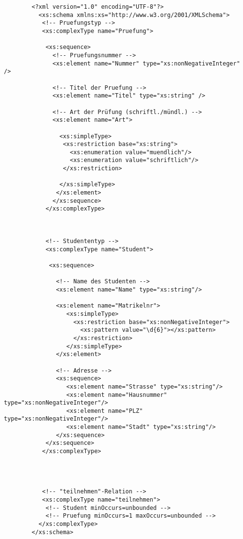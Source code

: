
	\begin{verbatim}
		<?xml version="1.0" encoding="UTF-8"?>
		  <xs:schema xmlns:xs="http://www.w3.org/2001/XMLSchema">
		   <!-- Pruefungstyp -->
		   <xs:complexType name="Pruefung">
		
		    <xs:sequence>
		      <!-- Pruefungsnummer -->
		      <xs:element name="Nummer" type="xs:nonNegativeInteger" />
		
		      <!-- Titel der Pruefung -->
		      <xs:element name="Titel" type="xs:string" />
		
		      <!-- Art der Prüfung (schriftl./mündl.) -->
		      <xs:element name="Art">
		 
		        <xs:simpleType>
		         <xs:restriction base="xs:string">
		           <xs:enumeration value="muendlich"/>
		           <xs:enumeration value="schriftlich"/>
		         </xs:restriction>
		
		        </xs:simpleType>
		       </xs:element>
		      </xs:sequence>
		    </xs:complexType>
		
		
		
		    <!-- Studententyp -->
		    <xs:complexType name="Student">
		    
		     <xs:sequence>
		     
		       <!-- Name des Studenten -->
		       <xs:element name="Name" type="xs:string"/>
		
		       <xs:element name="Matrikelnr">
		          <xs:simpleType>
		            <xs:restriction base="xs:nonNegativeInteger">
		              <xs:pattern value="\d{6}"></xs:pattern>
		            </xs:restriction>
		          </xs:simpleType>
		       </xs:element>
		       
		       <!-- Adresse -->
		       <xs:sequence>
		          <xs:element name="Strasse" type="xs:string"/>
		          <xs:element name="Hausnummer" type="xs:nonNegativeInteger"/>
		          <xs:element name="PLZ" type="xs:nonNegativeInteger"/>
		          <xs:element name="Stadt" type="xs:string"/>
	     	   </xs:sequence>
		    </xs:sequence>
		   </xs:complexType>
		
		
		
		
		   <!-- "teilnehmen"-Relation -->
		   <xs:complexType name="teilnehmen">
		    <!-- Student minOccurs=unbounded -->
		    <!-- Pruefung minOccurs=1 maxOccurs=unbounded -->
		  </xs:complexType>
		</xs:schema>
	\end{verbatim}